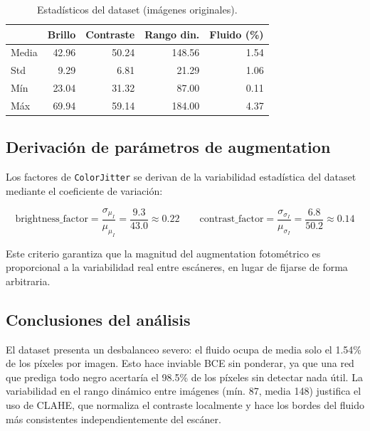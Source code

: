 \documentclass[12pt,a4paper]{article}
\begin{document}
\begin{table}[H]
\centering
\caption{Estadísticos del dataset (imágenes originales).}
\label{tab:stats}
\begin{tabular}{lrrrr}
\toprule
 & Brillo & Contraste & Rango din. & Fluido (\%) \\
\midrule
Media  & 42.96 & 50.24 & 148.56 & 1.54 \\
Std    &  9.29 &  6.81 &  21.29 & 1.06 \\
Mín    & 23.04 & 31.32 &  87.00 & 0.11 \\
Máx    & 69.94 & 59.14 & 184.00 & 4.37 \\
\bottomrule
\end{tabular}
\end{table}

\subsection{Derivación de parámetros de augmentation}

Los factores de \texttt{ColorJitter} se derivan de la variabilidad estadística del dataset mediante el coeficiente de variación:

\begin{equation}
    \text{brightness\_factor} = \frac{\sigma_{\mu_I}}{\mu_{\mu_I}} = \frac{9.3}{43.0} \approx 0.22
    \qquad
    \text{contrast\_factor} = \frac{\sigma_{\sigma_I}}{\mu_{\sigma_I}} = \frac{6.8}{50.2} \approx 0.14
\end{equation}

Este criterio garantiza que la magnitud del augmentation fotométrico es proporcional a la variabilidad real entre escáneres, en lugar de fijarse de forma arbitraria.

\subsection{Conclusiones del análisis}

El dataset presenta un desbalanceo severo: el fluido ocupa de media solo el 1.54\% de los píxeles por imagen. Esto hace inviable BCE sin ponderar, ya que una red que prediga todo negro acertaría el 98.5\% de los píxeles sin detectar nada útil. La variabilidad en el rango dinámico entre imágenes (mín. 87, media 148) justifica el uso de CLAHE, que normaliza el contraste localmente y hace los bordes del fluido más consistentes independientemente del escáner.

\end{document}
